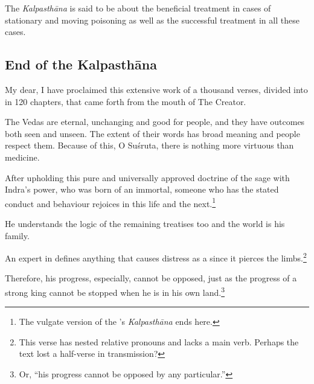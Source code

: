 \begin{translation}
The \emph{Kalpasthāna} is said to be about the beneficial treatment in cases of 
stationary and moving poisoning as well as the successful treatment in all these 
cases.


\subsection{End of the Kalpasthāna}

\item[140 add 6]

My dear, I have proclaimed this extensive work of a thousand verses, divided 
into in 120 chapters, that came forth from the mouth of The Creator.

\item[141--142]

The Vedas are eternal, unchanging and good for people, and they have 
outcomes both seen and unseen. The extent of their words has broad meaning 
and people respect them.  Because of this, O Suśruta, there is nothing more 
virtuous than medicine.

\item[143]

After upholding this pure and universally approved doctrine of the
sage with Indra's power, who was born of an immortal, someone who has
the stated conduct and behaviour rejoices in this life and the
next.\footnote{The vulgate version of the \SS's \emph{Kalpasthāna}
    ends here.}

\item[143 add 1]

He understands the logic of the remaining treatises too and the world is his 
family.

\item[143 add 2]

An expert in  defines anything that causes
distress as a  since it pierces the
limbs.\footnote{This verse has nested relative pronouns and lacks a
    main verb. Perhaps the text lost a half-verse in transmission?}

\item[143 add 3] 

Therefore, his progress, especially, cannot be opposed, just as the progress of a 
strong king cannot be stopped when he is in his own land.\footnote{Or, “his 
progress cannot be opposed by any particular.”}
 
\item[143 add 4]


\end{translation}
